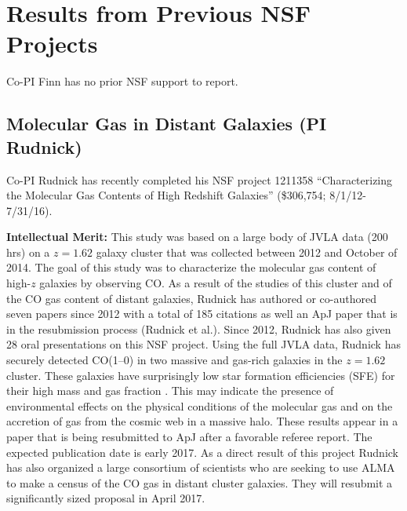\documentclass[11pt, preprint]{aastex}
\begin{document}
{\vspace*{-.8cm}
\section{Results from Previous NSF Projects}
\vspace*{-.2cm}

Co-PI Finn has no prior NSF support to report.
\vspace*{-.8cm}
\label{Sec:prior_rudnick}
\subsection{Molecular Gas in Distant Galaxies (PI Rudnick)}
\vspace*{-.4cm}

Co-PI Rudnick has recently completed his NSF project 1211358
``Characterizing the Molecular Gas Contents of High Redshift
Galaxies'' (\$306,754; 8/1/12-7/31/16).  

\textbf{Intellectual Merit:} This study was based on a large body of
JVLA data (200 hrs) on a $z=1.62$ galaxy cluster that was collected
between 2012 and October of 2014. The goal of this study was to
characterize the molecular gas content of high-$z$ galaxies by
observing CO. As a result of the studies of this cluster and of the CO
gas content of distant galaxies, Rudnick has authored or co-authored
seven papers since 2012 with a total of 185 citations
\citep{papovich12,rudnick12,lotz13,geach13,wong14,geach14,tran15} as
well an ApJ paper that is in the resubmission process (Rudnick et
al.).  Since 2012, Rudnick has also given 28 oral presentations on
this NSF project.
%
Using the full JVLA data, Rudnick has securely detected CO(1--0) in
two massive and gas-rich galaxies in the $z=1.62$ cluster. These
galaxies have surprisingly low star formation efficiencies (SFE) for
their high mass and gas fraction \citep[e.g.][]{genzel10}. This may
indicate the presence of environmental effects on the physical
conditions of the molecular gas and on the accretion of gas from the
cosmic web in a massive halo. These results appear in a paper that is
being resubmitted to ApJ after a favorable referee report.  The
expected publication date is early 2017.  As a direct result of this
project Rudnick has also organized a large consortium of scientists
who are seeking to use ALMA to make a census of the CO gas in distant
cluster galaxies.  They will resubmit a significantly sized proposal in
April 2017.

}
\end{document}
